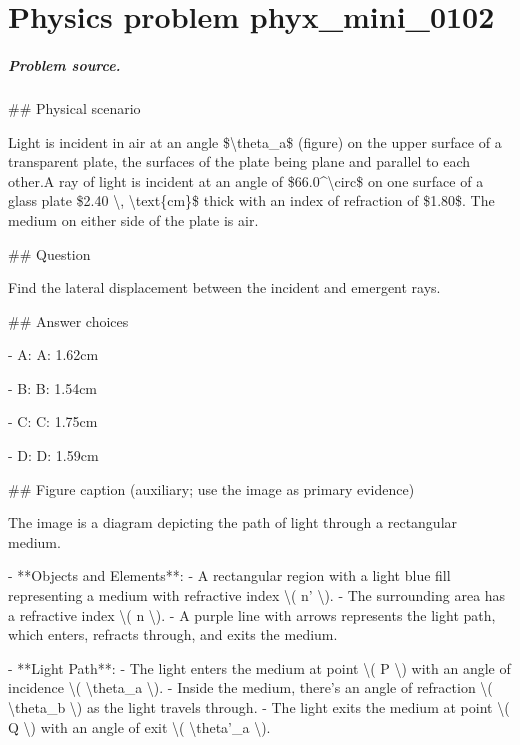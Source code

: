 
\chapter{Physics problem phyx\_mini\_0102}
\label{ch:PhyXMiniProblems_problem_phyx_mini_0102}

\paragraph{Problem source.}
\#\# Physical scenario

Light is incident in air at an angle \$\textbackslash{}theta\_a\$ (figure) on the upper surface of a transparent plate, the surfaces of the plate being plane and parallel to each other.A ray of light is incident at an angle of \$66.0\textasciicircum{}\textbackslash{}circ\$ on one surface of a glass plate \$2.40 \textbackslash{}, \textbackslash{}text\{cm\}\$ thick with an index of refraction of \$1.80\$. The medium on either side of the plate is air.

\#\# Question

Find the lateral displacement between the incident and emergent rays.

\#\# Answer choices

- A: A: 1.62cm

- B: B: 1.54cm

- C: C: 1.75cm

- D: D: 1.59cm

\#\# Figure caption (auxiliary; use the image as primary evidence)

The image is a diagram depicting the path of light through a rectangular medium.

- **Objects and Elements**:
  - A rectangular region with a light blue fill representing a medium with refractive index \textbackslash{}( n' \textbackslash{}).
  - The surrounding area has a refractive index \textbackslash{}( n \textbackslash{}).
  - A purple line with arrows represents the light path, which enters, refracts through, and exits the medium.

- **Light Path**:
  - The light enters the medium at point \textbackslash{}( P \textbackslash{}) with an angle of incidence \textbackslash{}( \textbackslash{}theta\_a \textbackslash{}).
  - Inside the medium, there's an angle of refraction \textbackslash{}( \textbackslash{}theta\_b \textbackslash{}) as the light travels through.
  - The light exits the medium at point \textbackslash{}( Q \textbackslash{}) with an angle of exit \textbackslash{}( \textbackslash{}theta'\_a \textbackslash{}).

